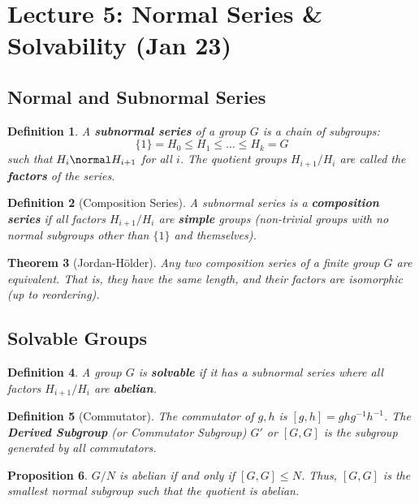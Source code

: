 \documentclass[a4paper,12pt]{article}
\newtheorem{thm}{Theorem}[section]
\newtheorem{defn}[thm]{Definition}
\newtheorem{prop}[thm]{Proposition}
\begin{document}
\newpage
\section{Lecture 5: Normal Series \& Solvability (Jan 23)}

\subsection{Normal and Subnormal Series}

\begin{defn}
    A \textbf{subnormal series} of a group $G$ is a chain of subgroups:
    \[ \{1\} = H_0 \leq H_1 \leq \dots \leq H_k = G \]
    such that $H_i \normal H_{i+1}$ for all $i$.
    The quotient groups $H_{i+1}/H_i$ are called the \textbf{factors} of the series.
\end{defn}

\begin{defn}[Composition Series]
    A subnormal series is a \textbf{composition series} if all factors $H_{i+1}/H_i$ are \textbf{simple} groups (non-trivial groups with no normal subgroups other than $\{1\}$ and themselves).
\end{defn}

\begin{thm}[Jordan-Hölder]
    Any two composition series of a finite group $G$ are equivalent. That is, they have the same length, and their factors are isomorphic (up to reordering).
\end{thm}

\subsection{Solvable Groups}

\begin{defn}
    A group $G$ is \textbf{solvable} if it has a subnormal series where all factors $H_{i+1}/H_i$ are \textbf{abelian}.
\end{defn}

\begin{defn}[Commutator]
    The commutator of $g, h$ is $[g,h] = ghg^{-1}h^{-1}$.
    The \textbf{Derived Subgroup} (or Commutator Subgroup) $G'$ or $[G,G]$ is the subgroup generated by all commutators.
\end{defn}

\begin{prop}
    $G/N$ is abelian if and only if $[G,G] \leq N$.
    Thus, $[G,G]$ is the smallest normal subgroup such that the quotient is abelian.
\end{prop}
\end{document}
